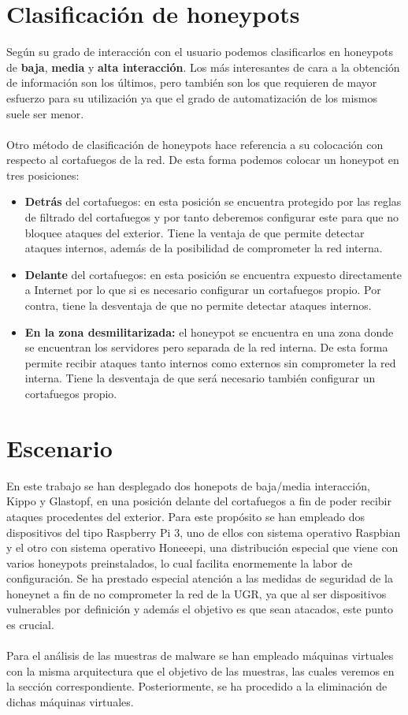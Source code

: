\documentclass[journal]{IEEEtran}
\begin{document}
\section{Clasificación de honeypots}
Según su grado de interacción con el usuario podemos clasificarlos en honeypots de \textbf{baja}, \textbf{media} y \textbf{alta interacción}. Los más interesantes de cara a la obtención de información son los últimos, pero también son los que requieren de mayor esfuerzo para su utilización ya que el grado de automatización de los mismos suele ser menor.
\\\\
Otro método de clasificación de honeypots hace referencia a su colocación con respecto al cortafuegos de la red. De esta forma podemos colocar un honeypot en tres posiciones:

\begin{itemize}
	\item \textbf{Detrás} del cortafuegos: en esta posición se encuentra protegido por las reglas de filtrado del cortafuegos y por tanto deberemos configurar este para que no bloquee ataques del exterior. Tiene la ventaja de que permite detectar ataques internos, además de la posibilidad de comprometer la red interna.
	\item \textbf{Delante} del cortafuegos: en esta posición se encuentra expuesto directamente a Internet por lo que si es necesario configurar un cortafuegos propio. Por contra, tiene la desventaja de que no permite detectar ataques internos.
	\item \textbf{En la zona desmilitarizada:} el honeypot se encuentra en una zona donde se encuentran los servidores pero separada de la red interna. De esta forma permite recibir ataques tanto internos como externos sin comprometer la red interna. Tiene la desventaja de que será necesario también configurar un cortafuegos propio.
\end{itemize}

\section{Escenario}
En este trabajo se han desplegado dos honepots de baja/media interacción, Kippo y Glastopf, en una posición delante del cortafuegos a fin de poder recibir ataques procedentes del exterior. Para este propósito se han empleado dos dispositivos del tipo Raspberry Pi 3, uno de ellos con sistema operativo Raspbian y el otro con sistema operativo Honeeepi, una distribución especial que viene con varios honeypots preinstalados, lo cual facilita enormemente la labor de configuración. Se ha prestado especial atención a las medidas de seguridad de la honeynet a fin de no comprometer la red de la UGR, ya que al ser dispositivos vulnerables por definición y además el objetivo es que sean atacados, este punto es crucial.
\\\\
Para el análisis de las muestras de malware se han empleado máquinas virtuales con la misma arquitectura que el objetivo de las muestras, las cuales veremos en la sección correspondiente. Posteriormente, se ha procedido a la eliminación de dichas máquinas virtuales.
\end{document}
